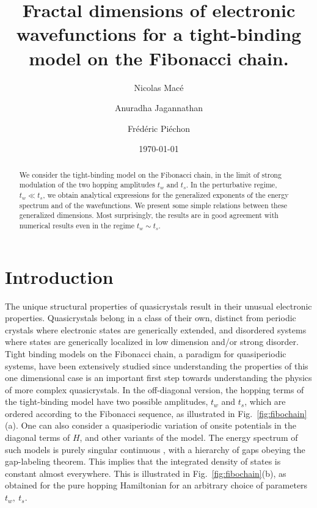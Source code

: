 \documentclass[aps,prl,preprint]{revtex4-1}
\begin{document}
\title{Fractal dimensions of electronic wavefunctions for a tight-binding model on the Fibonacci chain.}
\author{Nicolas Macé}
\author{Anuradha Jagannathan}
\author{Frédéric Piéchon}


\date{\today}

\begin{abstract}
We consider the tight-binding model on the Fibonacci chain, in the limit of strong modulation of the two hopping amplitudes $t_w$ and $t_s$.
In the perturbative regime, $t_w \ll t_s$, we obtain analytical expressions for the generalized exponents of the energy spectrum and of the wavefunctions. We present some simple relations between these generalized dimensions.
Most surprisingly, the results are in good agreement with numerical results even in the regime $ t_w \sim t_s $. 
\end{abstract}

\maketitle

\section*{Introduction}
The unique structural properties of quasicrystals result in their unusual electronic properties. 
Quasicrystals belong in a class of their own,  distinct from periodic crystals where electronic states are generically extended, and disordered systems where states are generically localized in low dimension and/or strong disorder.  
Tight binding models on the Fibonacci chain,  a paradigm for quasiperiodic systems, have been extensively studied since understanding the properties of this one dimensional case is an important first step towards understanding the physics of more complex quasicrystals. 
In the off-diagonal version, the hopping terms of the tight-binding model have two possible amplitudes, $t_w$ and $t_s$, which are ordered according to the Fibonacci sequence, as illustrated in Fig.~\ref{fig:fibochain}(a). 
One can also consider a quasiperiodic variation of onsite potentials in the diagonal terms of $H$, and other variants of the model. 
The energy spectrum of such models is purely singular continuous \cite{Suto1989}, with a hierarchy of gaps obeying the gap-labeling theorem.
This implies that the integrated density of states is constant almost everywhere. 
This is illustrated in Fig.~\ref{fig:fibochain}(b), as obtained for the pure hopping Hamiltonian for an arbitrary choice of parameters $t_w,~t_s$.
\end{document}
